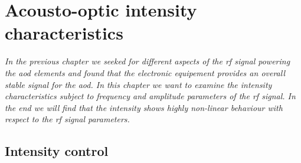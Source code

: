 \chapter{Acousto-optic intensity characteristics}

\textit{In the previous chapter we seeked for different aspects of the
\gls{rf} signal powering the \gls{aod} elements and found that the
electronic equipement provides an overall stable signal for the \gls{aod}.
In this chapter we want to examine the intensity characteristics subject
to frequency and amplitude parameters of the \gls{rf} signal. In the end
we will find that the intensity shows highly non-linear behaviour with
respect to the \gls{rf} signal parameters.}

\section{Intensity control}

